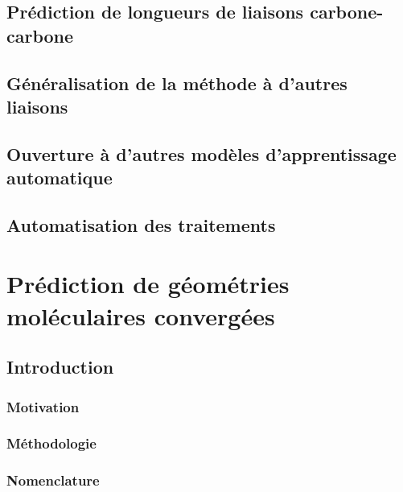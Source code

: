 \documentclass{report}
\begin{document}
	\section{Prédiction de longueurs de liaisons carbone-carbone}
		
	\section{Généralisation de la méthode à d'autres liaisons}
		
	\section{Ouverture à d'autres modèles d'apprentissage automatique}
		
	\section{Automatisation des traitements}
		
		


\chapter{Prédiction de géométries moléculaires convergées}
	\label{delta_dist_chap}

	\section{Introduction}
		\subsection{Motivation}
			
		\subsection{Méthodologie}
			
		\subsection{Nomenclature}
			
			
\end{document}
